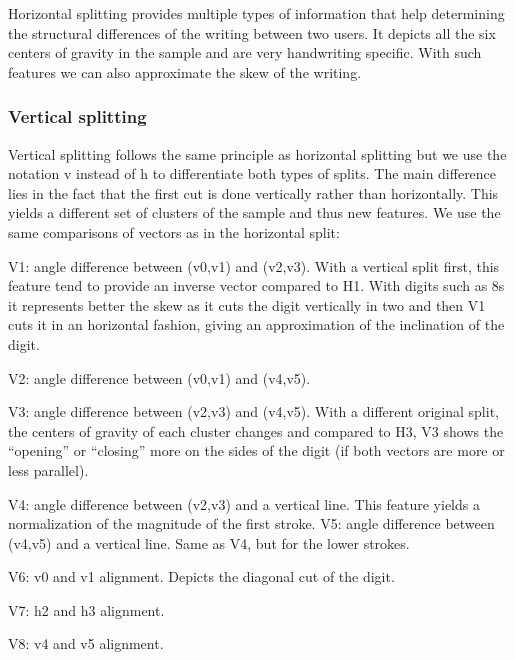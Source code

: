 \documentclass[a4paper]{article}
\begin{document}
{Horizontal splitting provides multiple types of information that help determining the structural differences of the writing between two users. It depicts all the six centers of gravity in the sample and are very handwriting specific. With such features we can also approximate the skew of the writing.

\subsubsection{Vertical splitting}

Vertical splitting follows the same principle as horizontal splitting but we use the notation v instead of h to differentiate both types of splits. The main difference lies in the fact that the first cut is done vertically rather than horizontally. This yields a different set of clusters of the sample and thus new features. We use the same comparisons of vectors as in the horizontal split:

\vspace{2mm}
\begin{listCustom}
	\item V1: angle difference between (v0,v1) and (v2,v3). With a vertical split first, this feature tend to provide an inverse vector compared to H1. With digits such as 8s it represents better the skew as it cuts the digit vertically in two and then V1 cuts it in an horizontal fashion, giving an approximation of the inclination of the digit. 
	\item V2: angle difference between (v0,v1) and (v4,v5).
	\item V3: angle difference between (v2,v3) and (v4,v5).  With a different original split, the centers of gravity of each cluster changes and compared to H3, V3 shows the “opening” or “closing” more on the sides of the digit (if both vectors are more or less parallel).
	\item V4: angle difference between (v2,v3) and a vertical line. This feature yields a normalization of the magnitude of the first stroke.
V5: angle difference between (v4,v5) and a vertical line. Same as V4, but for the lower strokes.
	\item V6: v0 and v1 alignment. Depicts the diagonal cut of the digit.
	\item V7: h2 and h3 alignment. 
	\item V8: v4 and v5 alignment.
\end{listCustom}
\vspace{1mm}

}
\end{document}
